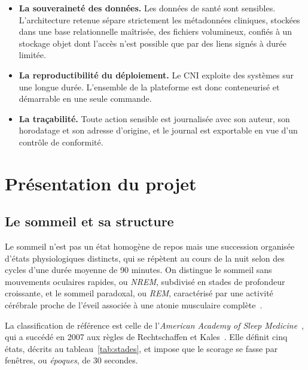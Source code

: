 \begin{itemize}[itemsep=2pt,topsep=4pt]
  \item \textbf{La souveraineté des données.} Les données de santé sont sensibles.
        L'architecture retenue sépare strictement les métadonnées cliniques, stockées
        dans une base relationnelle maîtrisée, des fichiers volumineux, confiés à un
        stockage objet dont l'accès n'est possible que par des liens signés à durée
        limitée.
  \item \textbf{La reproductibilité du déploiement.} Le CNI exploite des systèmes sur
        une longue durée. L'ensemble de la plateforme est donc conteneurisé et
        démarrable en une seule commande.
  \item \textbf{La traçabilité.} Toute action sensible est journalisée avec son auteur,
        son horodatage et son adresse d'origine, et le journal est exportable en vue
        d'un contrôle de conformité.
\end{itemize}

\section{Présentation du projet}

\subsection{Le sommeil et sa structure}

Le sommeil n'est pas un état homogène de repos mais une succession organisée d'états
physiologiques distincts, qui se répètent au cours de la nuit selon des cycles d'une
durée moyenne de 90 minutes. On distingue le sommeil sans mouvements oculaires rapides,
ou \emph{NREM}, subdivisé en stades de profondeur croissante, et le sommeil paradoxal,
ou \emph{REM}, caractérisé par une activité cérébrale proche de l'éveil associée à une
atonie musculaire complète~\cite{aasm2020}.

La classification de référence est celle de l'\emph{American Academy of Sleep
Medicine}~\cite{aasm2020}, qui a succédé en 2007 aux règles de Rechtschaffen et
Kales~\cite{rechtschaffen1968}. Elle définit cinq états, décrits au
tableau~\ref{tab:stades}, et impose que le scorage se fasse par fenêtres, ou
\emph{époques}, de 30 secondes.

